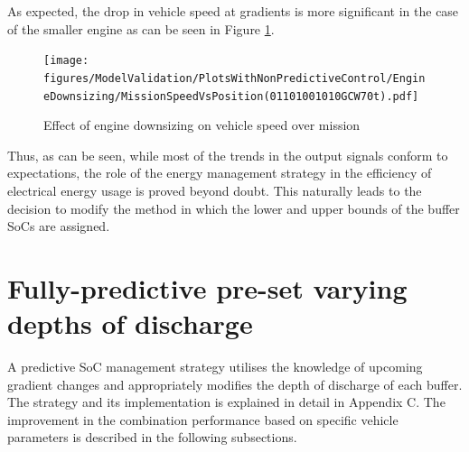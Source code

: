 \documentclass[ExampleMasters.tex]{subfiles}
\begin{document}
As expected, the drop in vehicle speed at gradients is more significant in the case of the smaller engine as can be seen in Figure \ref{speedEngineDownsizing}.
\begin{figure}
\centering
\texttt{[image: figures/ModelValidation/PlotsWithNonPredictiveControl/EngineDownsizing/MissionSpeedVsPosition(01101001010GCW70t).pdf]}
\caption{Effect of engine downsizing on vehicle speed over mission}
\label{speedEngineDownsizing}
\end{figure}
Thus, as can be seen, while most of the trends in the output signals conform to expectations, the role of the energy management strategy in the efficiency of electrical energy usage is proved beyond doubt. This naturally leads to the decision to modify the method in which the lower and upper bounds of the buffer SoCs are assigned.
\section{Fully-predictive pre-set varying depths of discharge}
A predictive SoC management strategy utilises the knowledge of upcoming gradient changes and appropriately modifies the depth of discharge of each buffer. The strategy and its implementation is explained in detail in Appendix C. The improvement in the combination performance based on specific vehicle parameters is described in the following subsections.
\end{document}
